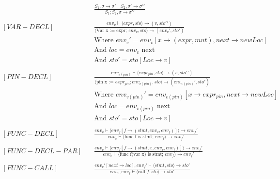 \begin{align*}
    [COMPOSITION] \quad   &
    \frac
    {S_1, \sigma \rightarrow \sigma \prime \quad S_2, \sigma \prime \rightarrow \sigma \prime \prime}
    {S_1;S_2, \sigma \rightarrow \sigma \prime \prime}
    \\
    \\
    [VAR-DECL]     \quad  &
    \frac
    {env_v \vdash\langle expr, sto\rangle\to (v, sto\prime \prime)}
    {\langle\text{Var x := expr; }env_v,sto\rangle \to (env_v\prime, sto\prime)}                                \\
                          & \text{Where } env_v\prime = env_v[x \to (expr, mut), next \to new Loc]              \\
                          & \text{And } loc = env_v \text{ next}                                                \\
                          & \text{And } sto\prime = sto [Loc \to v]
    \\
    \\
    [PIN-DECL] \quad      &
    \frac
    {env_{v(pin)} \vdash\langle expr_{pin}, sto\rangle\to (v, sto\prime \prime)}
    {\langle\text{pin x := }expr_{pin}; env_{v(pin)}, sto \rangle \to (env_{v(pin)}\prime, sto\prime)}          \\
                          & \text{Where } env_{v(pin)}\prime = env_{v(pin)}[x \to expr_{pin}, next \to new Loc] \\
                          & \text{And }loc = env_{v(pin)} \text{ next}                                          \\
                          & \text{And }sto\prime = sto[Loc \to v]
    \\
    \\
    [FUNC-DECL] \quad     &
    \frac
    {env_v\vdash\langle env_f[f \to (stmt, env_v, env_f)]\rangle \to env_f \prime}
    {env_v \vdash \langle \text{func f is stmt; } env_f \rangle \to env_f\prime}
    \\
    \\
    [FUNC-DECL-PAR] \quad &
    \frac
    {env_v\vdash\langle env_f[f \to (stmt, x, env_v, env_f)]\rangle \to env_f \prime}
    {env_v \vdash \langle \text{func f(var x) is stmt; } env_f \rangle \to env_f \prime}
    \\
    \\
    [FUNC-CALL] \quad     &
    \frac
    {env_v\prime [next \to loc], env_f\prime \vdash \langle stmt, sto \rangle \to sto\prime}
    {env_v, env_f \vdash \langle \text{call }f, sto\rangle \to sto\prime}

\end{align*}
